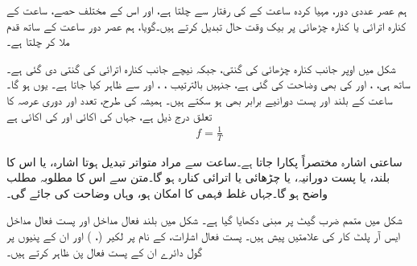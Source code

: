 ہم عصر عددی دور، مہیا کردہ  ساعت کے    کی رفتار سے چلتا ہے،  اور  اس  کے مختلف حصے،  ساعت کے کنارہ اترائی یا کنارہ چڑھائی پر بیک وقت حال تبدیل کرتے ہیں۔گویا،  ہم عصر دور ساعت کے ساتھ قدم ملا کر چلتا ہے۔


شکل     میں اوپر جانب کنارہ چڑھائی کی گنتی،  جبکہ نیچے  جانب کنارہ اترائی کی گنتی دی گئی ہے۔ساتھ ہی،   ،   اور کی بھی  وضاحت کی گئی ہے، جنہیں بالترتیب ، ، اور  سے ظاہر کیا جاتا ہے۔
یوں  ہو گا۔ ساعت کے بلند اور  پست دورانیے برابر بھی ہو سکتے ہیں۔ ہمیشہ کی طرح،  تعدد   اور   دوری عرصہ  کا تعلق   درج ذیل  ہے، جہاں  کی اکائی  اور  کی اکائی  ہے
\begin{align*}
f=\frac{1}{T}
\end{align*}

ساعتی اشارہ  مختصراً   پکارا جاتا ہے۔ساعت سے مراد متواتر تبدیل ہوتا اشارہ،  یا اس کا بلند،  یا پست دورانیہ،  یا   چڑھائی یا اترائی  کنارہ  ہو گا۔متن سے  اس کا مطلوبہ مطلب   واضح  ہو گا۔جہاں غلط فہمی کا امکان ہو،  وہاں وضاحت کی جائے گی۔


شکل    میں  متمم ضرب گیٹ پر مبنی    دکھایا گیا  ہے۔ شکل  میں بلند فعال مداخل  اور پست فعال مداخل  ایس آر پلٹ کار کی علامتیں پیش  ہیں۔ پست فعال اشارات، کے نام پر لکیر (، ) اور ان  کے پنیوں پر گول دائرے  ان کے پست فعال پن  ظاہر کرتے ہیں۔


